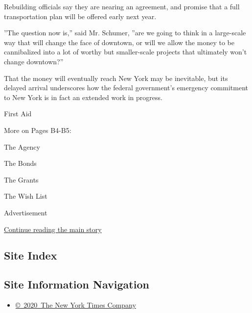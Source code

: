 Rebuilding officials say they are nearing an agreement, and promise that
a full transportation plan will be offered early next year.

''The question now is,'' said Mr. Schumer, ''are we going to think in a
large-scale way that will change the face of downtown, or will we allow
the money to be cannibalized into a lot of worthy but smaller-scale
projects that ultimately won't change downtown?''

That the money will eventually reach New York may be inevitable, but its
delayed arrival underscores how the federal government's emergency
commitment to New York is in fact an extended work in progress.

First Aid

More on Pages B4-B5:

The Agency

The Bonds

The Grants

The Wish List

Advertisement

\protect\hyperlink{after-bottom}{Continue reading the main story}

\hypertarget{site-index}{%
\subsection{Site Index}\label{site-index}}

\hypertarget{site-information-navigation}{%
\subsection{Site Information
Navigation}\label{site-information-navigation}}

\begin{itemize}
\tightlist
\item
  \href{https://help.nytimes3xbfgragh.onion/hc/en-us/articles/115014792127-Copyright-notice}{©~2020~The
  New York Times Company}
\end{itemize}

